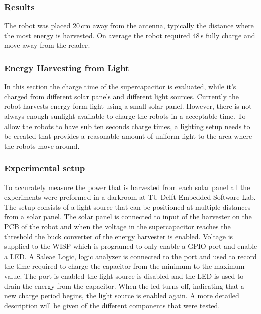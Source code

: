 \subsubsection{Results}
The robot was placed 20\,cm away from the antenna, typically the distance where the most energy is harvested.
On average the robot required 48\,s fully charge and move away from the reader.

\subsubsection{Energy Harvesting from Light}

In this section the charge time of the supercapacitor is evaluated, while it's charged from different solar panels and different light sources.
Currently the robot harvests energy form light using a small solar panel.
However, there is not always enough sunlight available to charge the robots in a acceptable time.
To allow the robots to have sub ten seconds charge times, a lighting setup needs to be created that provides a reasonable amount of uniform light to the area where the robots move around.


\subsubsection{Experimental setup}
To accurately measure the power that is harvested from each solar panel all the experiments were preformed in a darkroom at TU Delft Embedded Software Lab.
The setup consists of a light source that can be positioned at multiple distances from a solar panel.
The solar panel is connected to input of the harvester on the PCB of the robot and when the voltage in the supercapacitor reaches the threshold the buck converter of the energy harvester is enabled.
Voltage is supplied to the WISP which is programed to only enable a GPIO port and enable a LED.
A Saleae Logic, logic analyzer is connected to the port and used to record the time required to charge the capacitor from the minimum to the maximum value.
The port is enabled the light source is disabled and the LED is used to drain the energy from the capacitor.
When the led turns off, indicating that a new charge period begins, the light source is enabled again.
A more detailed description will be given of the different components that were tested.

